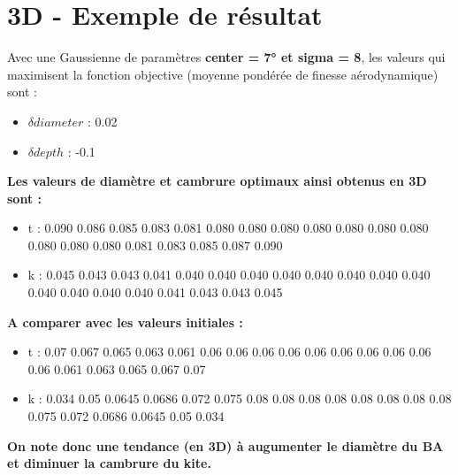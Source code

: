 
\section{3D - Exemple de résultat}
\label{sec:Ch3.4}

Avec une Gaussienne de paramètres \textbf{center = 7° et sigma = 8}, les valeurs qui maximisent la fonction objective (moyenne pondérée de finesse aérodynamique) sont :
\begin{itemize}
    \item $\delta diameter$ : 0.02
    \item $\delta depth$ : -0.1
\end{itemize}
\smallskip

\textbf{Les valeurs de diamètre et cambrure optimaux ainsi obtenus en 3D sont : 
}
\begin{itemize}
    \item t : 0.090 0.086 0.085 0.083 0.081 0.080 0.080  0.080 0.080 0.080 0.080  0.080 0.080 0.080 0.080 0.081 0.083 0.085 0.087 0.090
    \item k : 0.045 0.043 0.043 0.041 0.040 0.040 0.040  0.040 0.040 0.040 0.040 0.040 0.040 0.040  0.040 0.040 0.041 0.043 0.043 0.045
\end{itemize}
\smallskip

\textbf{A comparer avec les valeurs initiales :}
\begin{itemize}
    \item t : 0.07 0.067 0.065 0.063 0.061 0.06 0.06  0.06 0.06 0.06  0.06  0.06 0.06 0.06  0.06 0.061 0.063 0.065 0.067 0.07
    \item k : 0.034 0.05 0.0645 0.0686 0.072 0.075 0.08 0.08 0.08 0.08 0.08 0.08 0.08 0.08 0.075 0.072 0.0686 0.0645 0.05 0.034
\end{itemize}

\textbf{On note donc une tendance (en 3D) à augumenter le diamètre du BA et diminuer la cambrure du kite. }
